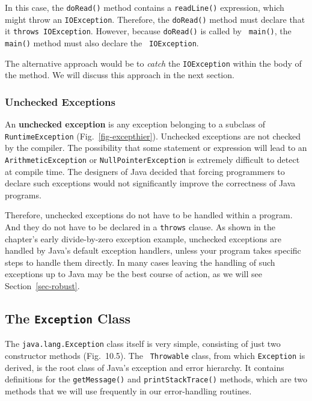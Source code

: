 \noindent In this case, the {\tt doRead()} method contains a
{\tt readLine()} expression, which might throw an {\tt IOException}.
Therefore, the {\tt doRead()} method must declare that it {\tt throws
IOException}. However, because {\tt doRead()} is called by {\tt
main()}, the {\tt main()} method must also declare the {\tt
IOException}.  


The alternative approach would be to {\em catch} the {\tt IOException} 
within the body of the method.  We will discuss this approach
in the next section.

\subsubsection*{Unchecked Exceptions}
\noindent An {\bf unchecked exception} is any 
exception belonging to a subclass
of {\tt RuntimeException} (Fig.~\ref{fig-excepthier}). Unchecked
exceptions are not checked by the compiler.  The possibility that some
statement or expression will lead to an {\tt ArithmeticException} or
{\tt NullPointerException} is extremely difficult to detect at compile
time.  The designers of Java decided that forcing programmers to
declare such exceptions would not significantly improve the
correctness of Java programs.

Therefore, unchecked exceptions do not have to be handled within a
program.  And they do not have to be declared in a {\tt throws}
 clause.  As shown in the
chapter's early divide-by-zero exception example, unchecked exceptions
are handled by Java's default exception handlers, unless your program
takes specific steps to handle them directly.  In many cases leaving
the handling of such exceptions up to Java may be the best course of
action, as we will see Section~\ref{sec-robust}.


\subsection{The {\tt Exception} Class}
\noindent The {\tt java.lang.Exception} class itself is very simple,
consisting of just two constructor methods (Fig.~10.5). The {\tt
Throwable} class, from which {\tt Exception} is derived, is the root
class of Java's exception and error hierarchy.  It contains
definitions for the {\tt getMessage()} and {\tt printStackTrace()}
methods, which are
two methods that we will use frequently in our error-handling routines.



